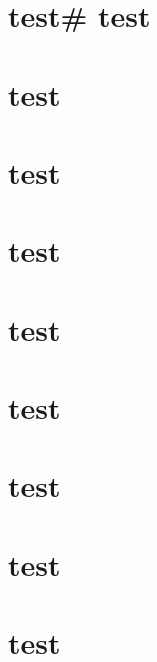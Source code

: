 \documentclass{article}%
\begin{document}
%
\sectionfont{\color{brown}}%
\subsectionfont{\color{brown}}%
\subsubsectionfont{\color{brown}}%
\section{  test\#  test
}%
\label{sec:testtest}%

%
\section{  test
}%
\label{sec:test}%

%
\sectionfont{\color{blue}}%
\subsectionfont{\color{blue}}%
\subsubsectionfont{\color{blue}}%
\section{  test
}%
\label{sec:test}%

%
\sectionfont{\color{green}}%
\subsectionfont{\color{green}}%
\subsubsectionfont{\color{green}}%
\section{  test
}%
\label{sec:test}%

%
\sectionfont{\color{red}}%
\subsectionfont{\color{red}}%
\subsubsectionfont{\color{red}}%
\section{  test
}%
\label{sec:test}%

%
\sectionfont{\color{cyan}}%
\subsectionfont{\color{cyan}}%
\subsubsectionfont{\color{cyan}}%
\section{  test
}%
\label{sec:test}%

%
\sectionfont{\color{orange}}%
\subsectionfont{\color{orange}}%
\subsubsectionfont{\color{orange}}%
\section{  test
}%
\label{sec:test}%

%
\sectionfont{\color{purple}}%
\subsectionfont{\color{purple}}%
\subsubsectionfont{\color{purple}}%
\section{  test
}%
\label{sec:test}%

%
\sectionfont{\color{yellow}}%
\subsectionfont{\color{yellow}}%
\subsubsectionfont{\color{yellow}}%
\section{  test}%
\label{sec:test}%

%
\end{document}
